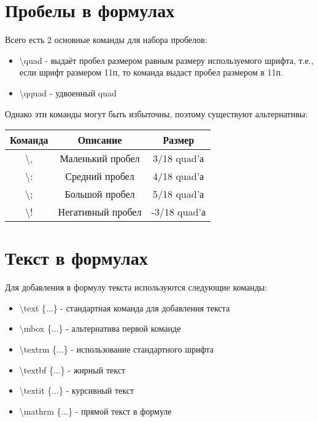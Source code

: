 \documentclass[a4paper,12pt]{article}
\begin{document}
{\section{Пробелы в формулах}
\hspace{1.25cm}Всего есть 2 основные команды для набора пробелов:
\begin{itemize}
    \item \textsf{\textbackslash quad} - выдаёт пробел размером равным размеру используемого шрифта, т.е., если шрифт размером 11п, то команда выдаст пробел размером в 11п.
    \item \textsf{\textbackslash qquad} - удвоенный quad
\end{itemize}
Однако эти команды могут быть избыточны, поэтому существуют альтернативы:
\begin{center}
    \begin{tabular}[h]{|c|c|c|}
    \hline
    Команда & Описание & Размер \\ \hline
    \textbackslash , & Маленький пробел & 3/18 quad'а\\ \hline
    \textbackslash : & Средний пробел & 4/18 quad'а\\ \hline
    \textbackslash ; & Большой пробел & 5/18 quad'а\\ \hline
    \textbackslash ! & Негативный пробел & -3/18 quad'а\\ \hline
    \end{tabular}
\end{center}

\section{Текст в формулах}
\hspace{1.25cm}Для добавления в формулу текста используются следующие команды:
\begin{itemize}
    \item \textsf{\textbackslash text \{...\}} - стандартная команда для добавления текста
    \item \textsf{\textbackslash mbox \{...\}} - альтернатива первой команде
    \item \textsf{\textbackslash textrm \{...\}} - использование стандартного шрифта
    \item \textsf{\textbackslash textbf \{...\}} - жирный текст
    \item \textsf{\textbackslash textit \{...\}} - курсивный текст
    \item \textsf{\textbackslash mathrm \{...\}} - прямой текст в формуле
\end{itemize}
\clearpage

}
\end{document}
